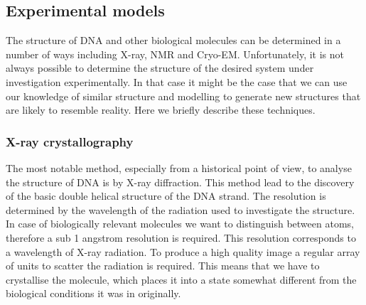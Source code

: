 \subsection{Experimental models}

The structure of DNA and other biological molecules can be determined in a number of ways including X-ray, NMR and Cryo-EM. Unfortunately, it is not always possible to determine the structure of the desired system under investigation experimentally. In that case it might be the case that we can use our knowledge of similar structure and modelling to generate new structures that are likely to resemble reality. Here we briefly describe these techniques.

\subsubsection{X-ray crystallography}

The most notable method, especially from a historical point of view, to analyse the structure of DNA is by X-ray diffraction. This method lead to the discovery of the basic double helical structure of the DNA strand. The resolution is determined by the wavelength of the radiation used to investigate the structure. In case of biologically relevant molecules we want to distinguish between atoms, therefore a sub 1 angstrom resolution is required. This resolution corresponds to a wavelength of X-ray radiation. To produce a high quality image a regular array of units to scatter the radiation is required. This means that we have to crystallise the molecule, which places it into a state somewhat different from the biological conditions it was in originally.

